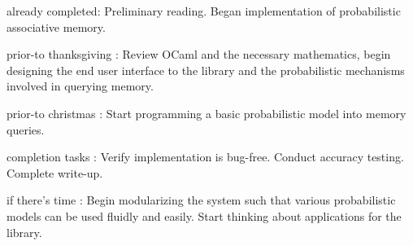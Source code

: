 \documentclass{sig-alternate}
\begin{document}
\begin{itemize*}
	\item {\sc already completed}: Preliminary reading. Began implementation of probabilistic associative memory.\vspace{3pt}
	\item {\sc prior-to thanksgiving} : Review OCaml and the necessary mathematics, begin designing the end user interface to the library and the probabilistic mechanisms involved in querying memory.\vspace{3pt}
	\item {\sc prior-to christmas} : Start programming a basic probabilistic model into memory queries.\vspace{3pt}
	\item {\sc completion tasks} : Verify implementation is bug-free. Conduct accuracy testing. Complete write-up.\vspace{3pt}
	\item {\sc if there's time} : Begin modularizing the system such that various probabilistic models can be used fluidly and easily. 
                                    Start thinking about applications for the library.
\end{itemize*}


\vspace{175pt}


\end{document}
